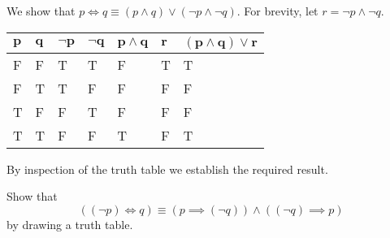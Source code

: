\begin{example}
    We show that $p \iff q \equiv (p \land q) \lor (\lnot p \land \lnot q)$. For brevity, let $r = \lnot p \land \lnot q$.
    \begin{table}[h]
        \centering
        \begin{tabular}{|l|l||l|l|l|l||l|}
            \hline
            $\boldsymbol{p}$ & $\boldsymbol{q}$ & $\boldsymbol{\lnot p}$ & $\boldsymbol{\lnot q}$ & $\boldsymbol{p \land q}$ & $\boldsymbol{r}$ & $\boldsymbol{(p \land q) \lor r}$ \\ \hline
            F   & F   & T         & T         & F           & T   & T                    \\ \hline
            F   & T   & T         & F         & F           & F   & F                    \\ \hline
            T   & F   & F         & T         & F           & F   & F                    \\ \hline
            T   & T   & F         & F         & T           & F   & T                    \\ \hline
        \end{tabular}
    \end{table}

    By inspection of the truth table we establish the required result.
\end{example}

\begin{exercise}
    Show that
    \[
        ((\lnot p) \iff q) \equiv (p \implies (\lnot q)) \land ((\lnot q) \implies p)
    \]
    by drawing a truth table.
\end{exercise}

